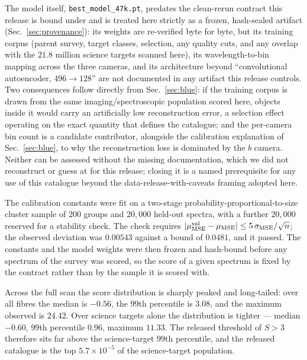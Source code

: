 \documentclass[aps,prd,twocolumn,superscriptaddress,nofootinbib,longbibliography,floatfix]{revtex4-2}
\begin{document}
The model itself, \texttt{best\_model\_47k.pt}, predates the clean-rerun
contract this release is bound under and is treated here strictly as a
frozen, hash-sealed artifact (Sec.~\ref{sec:provenance}): its weights are
re-verified byte for byte, but its training corpus (parent survey, target
classes, selection, any quality cuts, and any overlap with the $21.8$
million science targets scanned here), its wavelength-to-bin mapping across
the three cameras, and its architecture beyond ``convolutional
autoencoder, $496\!\to\!128$'' are not documented in any artifact this
release controls. Two consequences follow directly from Sec.~\ref{sec:blue}:
if the training corpus is drawn from the same imaging/spectroscopic
population scored here, objects inside it would carry an artificially low
reconstruction error, a selection effect operating on the exact quantity
that defines the catalogue; and the per-camera bin count is a candidate
contributor, alongside the calibration explanation of Sec.~\ref{sec:blue},
to why the reconstruction loss is dominated by the $b$ camera. Neither can be
assessed without the missing documentation, which we did not reconstruct or
guess at for this release; closing it is a named prerequisite for any use of
this catalogue beyond the data-release-with-caveats framing adopted here.

The calibration constants were fit on a two-stage
probability-proportional-to-size cluster
sample
of $200$ groups and $20{,}000$ held-out spectra, with a further $20{,}000$
reserved for a stability check.
The check requires
$|\mu^{\rm val}_{\rm MSE} - \mu_{\rm MSE}| \le 5\,\sigma_{\rm MSE}/\sqrt{n}$;
the observed deviation was $0.00543$ against a bound of
$0.0481$, and it passed.
The constants and the model weights were then frozen and hash-bound before any
spectrum of the survey was scored, so the score of a given spectrum is fixed
by the contract rather than by the sample it is scored with.

Across the full scan the score distribution is sharply peaked and
long-tailed: over all fibres the median is $-0.56$, the $99$th percentile is
$3.08$, and the maximum observed is
$24.42$.
Over science targets alone the distribution is tighter --- median $-0.60$,
$99$th percentile $0.96$, maximum
$11.33$.
The released threshold of $S>3$ therefore sits far above the science-target
$99$th percentile, and the released catalogue is the top
$5.7\times10^{-5}$ of the science-target
population.
\end{document}
